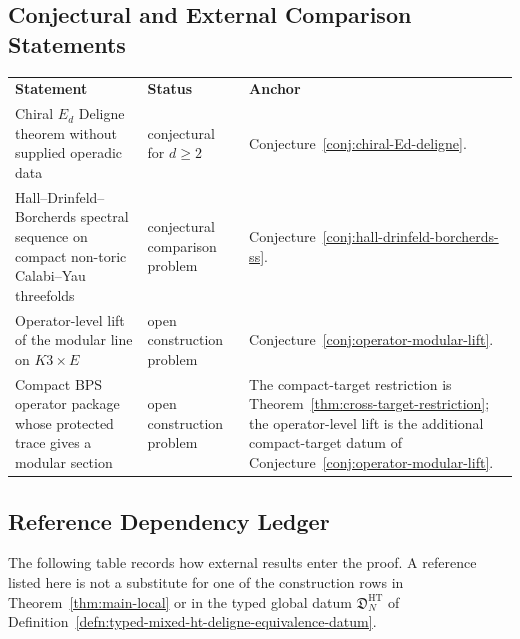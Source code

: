 \subsection{Conjectural and External Comparison Statements}

\begin{center}
\footnotesize
\renewcommand{\arraystretch}{1.15}
\begin{tabular}{@{}>{\raggedright\arraybackslash}p{}
  >{\raggedright\arraybackslash}p{}
  >{\raggedright\arraybackslash}p{}@{}}
\textbf{Statement} & \textbf{Status} & \textbf{Anchor} \\
Chiral \(E_d\) Deligne theorem without supplied operadic data &
conjectural for \(d\geq2\) &
Conjecture~\ref{conj:chiral-Ed-deligne}. \\
Hall--Drinfeld--Borcherds spectral sequence on compact non-toric
Calabi--Yau threefolds &
conjectural comparison problem &
Conjecture~\ref{conj:hall-drinfeld-borcherds-ss}. \\
Operator-level lift of the modular line on \(K3\times E\) &
open construction problem &
Conjecture~\ref{conj:operator-modular-lift}. \\
Compact BPS operator package whose protected trace gives a modular
section &
open construction problem &
The compact-target restriction is Theorem~\ref{thm:cross-target-restriction};
the operator-level lift is the additional compact-target datum of
Conjecture~\ref{conj:operator-modular-lift}. \\
\end{tabular}
\end{center}

\subsection{Reference Dependency Ledger}

The following table records how external results enter the proof.  A
reference listed here is not a substitute for one of the construction
rows in Theorem~\ref{thm:main-local} or in the typed global datum
\(\mathfrak D^{\mathrm{HT}}_N\) of
Definition~\ref{defn:typed-mixed-ht-deligne-equivalence-datum}.

